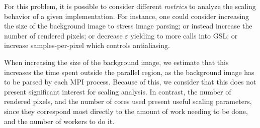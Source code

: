 
For this problem, it is possible to consider different \textit{metrics} to analyze the scaling behavior of a given implementation.
For instance, one could consider increasing the size of the background image to stress image parsing;
or instead increase the number of rendered pixels;
or decrease $\varepsilon$ yielding to more calls into GSL;
or increase samples-per-pixel which controls antialiasing.

When increasing the size of the background image, we estimate that this increases the time spent outside the parallel region, as the background image has to be parsed by each MPI process.
Because of this, we consider that this does not present significant interest for scaling analysis.
In contrast, the number of rendered pixels, and the number of cores used present useful scaling parameters, since they correspond most directly to the amount of work needing to be done, and the number of workers to do it.

